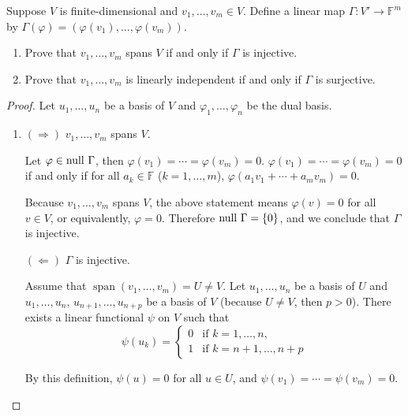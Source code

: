 \begin{exercise}
    Suppose $V$ is finite-dimensional and $v_{1} , \ldots, v_{m} \in V$. Define a linear map $\Gamma: V'\to \mathbb{F}^{m}$ by $\Gamma(\varphi) = (\varphi(v_{1}), \ldots, \varphi(v_{m}))$.
    \begin{enumerate}[label={(\alph*)}]
        \item Prove that $v_{1}, \ldots, v_{m}$ spans $V$ if and only if $\Gamma$ is injective.
        \item Prove that $v_{1}, \ldots, v_{m}$ is linearly independent if and only if $\Gamma$ is surjective.
    \end{enumerate}
\end{exercise}

\begin{proof}
    Let $u_{1}, \ldots, u_{n}$ be a basis of $V$ and $\varphi_{1}, \ldots, \varphi_{n}$ be the dual basis.

    \begin{enumerate}[label={(\alph*)}]
        \item $(\Rightarrow)$ $v_{1}, \ldots, v_{m}$ spans $V$.

              Let $\varphi\in\operatorname{null}\,{\Gamma}$, then $\varphi(v_{1}) = \cdots = \varphi(v_{m}) = 0$. $\varphi(v_{1}) = \cdots = \varphi(v_{m}) = 0$ if and only if for all $a_{k}\in\mathbb{F}$ ($k = 1,\ldots,m$), $\varphi(a_{1}v_{1} + \cdots + a_{m}v_{m}) = 0$.

              Because $v_{1}, \ldots, v_{m}$ spans $V$, the above statement means $\varphi(v) = 0$ for all $v\in V$, or equivalently, $\varphi = 0$. Therefore $\operatorname{null}\,{\Gamma} = \{0\}$, and we conclude that $\Gamma$ is injective.

              $(\Leftarrow)$ $\Gamma$ is injective.

              Assume that $\operatorname{span}(v_{1}, \ldots, v_{m}) = U\ne V$. Let $u_{1}, \ldots, u_{n}$ be a basis of $U$ and $u_{1}, \ldots, u_{n}$, $u_{n+1}, \ldots, u_{n+p}$ be a basis of $V$ (because $U\ne V$, then $p > 0$). There exists a linear functional $\psi$ on $V$ such that
              \[
                  \psi(u_{k}) = \begin{cases}
                      0 & \text{if $k = 1, \ldots, n$},    \\
                      1 & \text{if $k = n+1, \ldots, n+p$}
                  \end{cases}
              \]

              By this definition, $\psi(u) = 0$ for all $u\in U$, and $\psi(v_{1}) = \cdots = \psi(v_{m}) = 0$.


\end{enumerate}
\end{proof}
